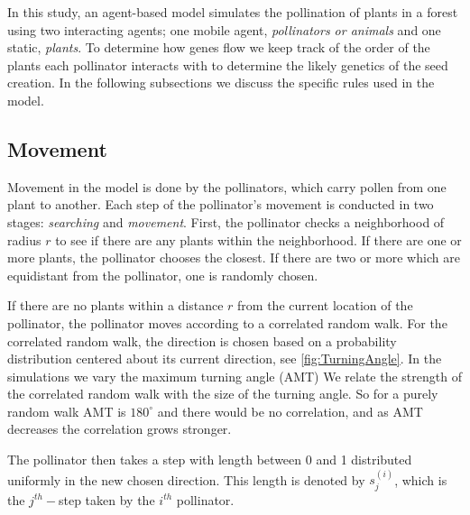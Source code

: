 In this study, an agent-based model simulates the pollination of plants in a
forest using two interacting agents; one mobile agent, \emph{pollinators or
animals} and one static, \emph{plants}.  To determine how genes flow we keep
track of the order of the plants each pollinator interacts with to determine the
likely genetics of the seed creation. In the following subsections we discuss
the specific rules used in the model.

\subsection{Movement}

Movement in the model is done by the pollinators, which carry pollen from one
plant to another.  Each step of the pollinator's movement is conducted in two
stages: \emph{searching} and \emph{movement}.  First, the pollinator checks a
neighborhood of radius $r$ to see if there are any plants within the
neighborhood.  If there are one or more plants, the pollinator chooses the
closest.  If there are two or more which are equidistant from the pollinator, one
is randomly chosen.

If there are no plants within a distance $r$ from the current location of the
pollinator, the pollinator moves according to a correlated random walk.  For the
correlated random walk, the direction is chosen based on a probability
distribution centered about its current direction, see
\cref{fig:TurningAngle}.  In the simulations we vary the maximum turning
angle (AMT) %
We relate the
strength of the correlated random walk with the size of the turning angle.  So
for a purely random walk AMT is $180^{\circ}$ and there would be no correlation,
and as AMT decreases the correlation grows stronger.

The pollinator then takes a step with length between 0 and 1 distributed
uniformly in the new chosen direction.  This length is denoted by $s_j^{(i)}$,
which is the $j^{th}-$step taken by the $i^{th}$ pollinator.

